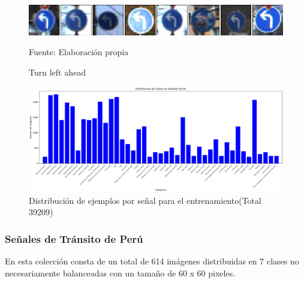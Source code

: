 			\begin{figure}[H]
				\begin{center}
				\includegraphics[width=1\textwidth]{images/desarrollo/imagenes/alemania/1__(35).png}
				\end{center}
				\begin{center}
				\caption{\small{Turn left ahead}}
				\vskip -0.25cm
				{\small{Fuente: Elaboración propia}}
				\end{center}
				\vspace{-1.5em}
			\end{figure}

			\vskip 0.75cm
			\begin{figure}[H]
				\begin{center}
				\includegraphics[width=1\textwidth, height=1.2\textheight,keepaspectratio]{images/desarrollo/histograms/initial39209}
				\end{center}
				\begin{center}
				\caption{\small{Distribución de ejemplos por señal para el entrenamiento(Total 39209)}}	
				{\small{\fontsize{10}{16.8}\selectfont {Fuente: Elaboración propia}}}
				\end{center}
				\vspace{-1.5em}
			\end{figure}


		\subsubsection{Señales de Tránsito de Perú}

			En esta colección consta de un total de 614 imágenes distribuidas en 7 clases no necesariamente balanceadas con un tamaño de 60 x 60 pixeles.

